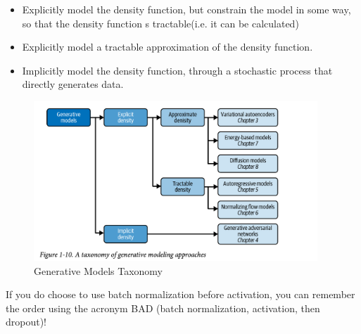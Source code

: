 \begin{itemize}
	\item Explicitly model the density function, but constrain the model in some way, so that the density function s tractable(i.e. it can be calculated)
	\item Explicitly model a tractable approximation of the density function.
	\item Implicitly model the density function, through a stochastic process that directly generates data.
\end{itemize}



\begin{figure}
	\begin{center}
		\includegraphics[width=0.95\textwidth]{figures/generative_model_taxonomy}
	\end{center}
	\caption{Generative Models Taxonomy}\label{fig:gmodel_taxonomy}
\end{figure}



If you do choose to use batch normalization before activation, you can remember the order using the acronym BAD (batch normalization, activation, then dropout)!
